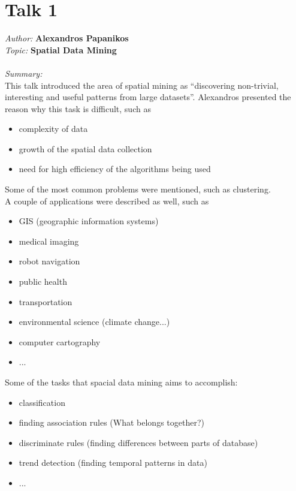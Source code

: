 \documentclass[runningheads,a4paper]{llncs}
\begin{document}
\section{Talk 1}
\textit{Author:} \textbf{Alexandros Papanikos}\\
\textit{Topic:}\hspace{0.25cm} \textbf{Spatial Data Mining}\\
\\
\textit{Summary:} \\
This talk introduced the area of spatial mining as ``discovering non-trivial, interesting and useful patterns from large datasets''. Alexandros presented the reason why this task is difficult, such as
\begin{itemize}
\item complexity of data
\item growth of the spatial data collection
\item need for high efficiency of the algorithms being used
\end{itemize}
Some of the most common problems were mentioned,  such as clustering.\\
A couple of applications were described as well, such as
\begin{itemize}
\item GIS (geographic information systems)
\item medical imaging
\item robot navigation
\item public health
\item transportation
\item environmental science (climate change...)
\item computer cartography
\item ...
\end{itemize}
Some of the tasks that spacial data mining aims to accomplish:
\begin{itemize}
\item classification
\item finding association rules (What belongs together?)
\item discriminate rules (finding differences between parts of database)
\item trend detection (finding temporal patterns in data)
\item ...
\end{itemize}
\end{document}
